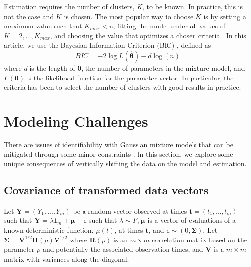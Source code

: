 \documentclass[12pt]{article}
\newcommand{\B}[0]{\mathbf}
\newcommand{\BS}[0]{\boldsymbol}
\begin{document}
Estimation requires the number of clusters, $K$, to be known. In practice, this is not the case and $K$ is chosen. The most popular way to choose $K$ is by setting a maximum value such that $K_{max}<n$, fitting the model under all values of $K=2,...,K_{max}$, and choosing the value that optimizes a chosen criteria \cite{celeux1996,fraley1998}. In this article, we use the Bayesian Information Criterion (BIC) \cite{schwarz1978}, defined as
$$BIC = -2\log L(\hat{\BS\theta})- d\log(n)$$
where $d$ is the length of $\BS\theta$, the number of parameters in the mixture model, and $L(\BS\theta)$ is the likelihood function for the parameter vector.  In particular, the criteria has been to select the number of clusters \cite{dasgupta1999,fraley1999} with good results in practice.

\section{Modeling Challenges}
There are issues of identifiability with Gaussian mixture models that can be mitigated through some minor constraints \cite{mclachlan2000}. In this section, we explore some unique consequences of vertically shifting the data on the model and estimation.
\subsection{Covariance of transformed data vectors}
Let $\B Y=(Y_{1},...,Y_{m})$ be a random vector observed at times $\B t=(t_{1},...,t_{m})$ such that
$\B Y = \lambda\B 1_{m} + \BS\mu + \BS\epsilon$
such that $\lambda\sim F$, $\BS\mu$ is a vector of evaluations of a known deterministic function, $\mu(t)$, at times $\B t$, and $\BS\epsilon\sim(0,\BS\Sigma)$. Let $\B\Sigma =\B V^{1/2}\B R(\rho)\B V^{1/2}$ where $\B R(\rho)$ is an $m\times m$ correlation matrix based on the parameter $\rho$ and potentially the associated observation times, and $\B V$ is a $m\times m$ matrix with variances along the diagonal. 
\end{document}
